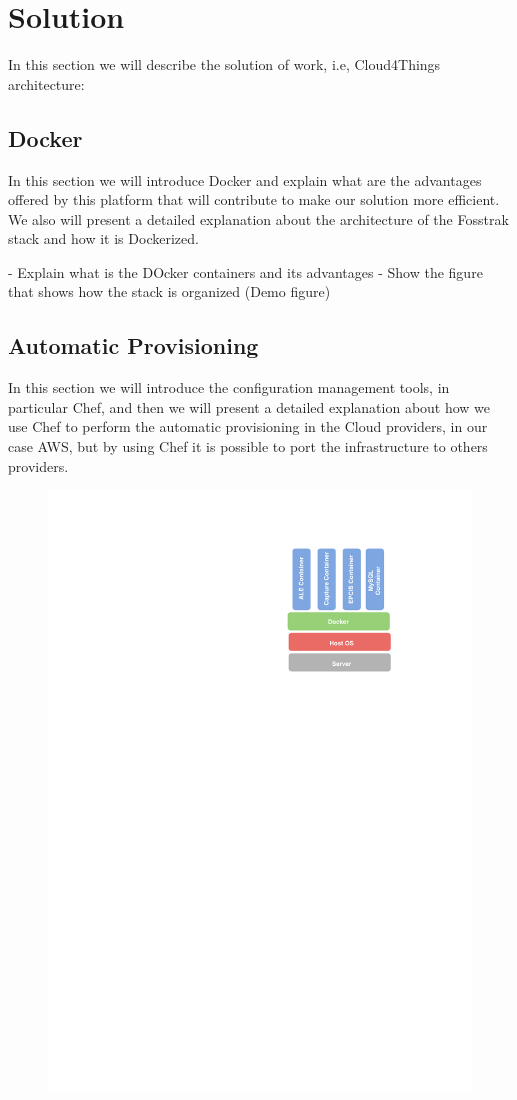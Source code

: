 \documentclass{../llncs2e/llncs}
\begin{document}
\section{Solution}
\label{sec:solution}
In this section we will describe the solution of work, i.e, Cloud4Things architecture:
\subsection{Docker}
\label{sub:docker}
In this section we will introduce Docker and explain what are the advantages offered by this
platform that will contribute to make our solution more efficient. We also will present a detailed
explanation about the architecture of the Fosstrak stack and how it is Dockerized.

- Explain what is the DOcker containers and its advantages
- Show the figure that shows how the stack is organized (Demo figure)
\subsection{Automatic Provisioning}
\label{sub:Automatic Provisioning}
In this section we will introduce the configuration management tools, in particular Chef, and then
we will present a detailed explanation about how we use Chef to perform the automatic provisioning
in the Cloud providers, in our case AWS, but by using Chef it is possible to port the
infrastructure to others providers.
\begin{figure}
  \centering
  \includegraphics[width=.5\textwidth]{images/docker-stack}
\end{figure}
\end{document}
